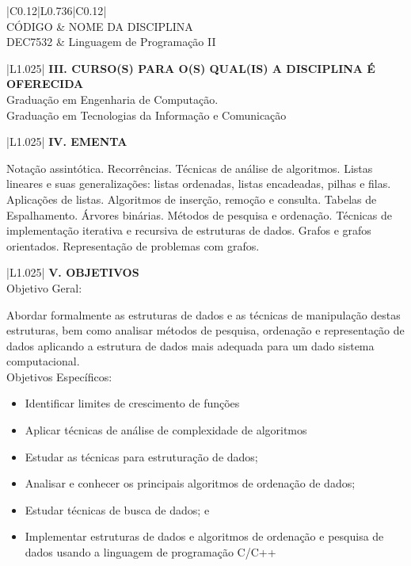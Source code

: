 \documentclass[12pt]{article}
\newcommand{\requisitoA}{DEC7532 & Linguagem de Programação II}
\newcommand{\requisitoB}{}
\newcommand{\requisitoC}{}
\newcommand{\cursoA}{Graduação em Engenharia de Computação. \\ \hline}
\newcommand{\cursoB}{Graduação em Tecnologias da Informação e Comunicação \\ \hline}
\newcommand{\cursoC}{}
\newcommand{\ementa}{

Notação assintótica. Recorrências. Técnicas de análise de algoritmos. Listas lineares e suas generalizações: listas ordenadas, listas encadeadas, pilhas e filas. Aplicações de listas. Algoritmos de inserção, remoção e consulta. Tabelas de Espalhamento. Árvores binárias. Métodos de pesquisa e ordenação. Técnicas de implementação iterativa e recursiva de estruturas de dados. Grafos e grafos orientados. Representação de problemas com grafos.
 \\ \hline
}
\begin{document}
\begin{longtable}{|C{0.12\textwidth}|L{0.736\textwidth}|C{0.12\textwidth}|} \hline
%
 \\ \hline
%
CÓDIGO & NOME DA DISCIPLINA \\ \hline	
%
\requisitoA \\ \hline
\requisitoB
\requisitoC
\end{longtable}


\begin{longtable}{|L{1.025\textwidth}|} \hline
%
{\bf III. CURSO(S) PARA O(S) QUAL(IS) A DISCIPLINA É OFERECIDA } \\ \hline
%
\cursoA 
\cursoB
\cursoC

\end{longtable}

\begin{longtable}{|L{1.025\textwidth}|} \hline
%
{\bf IV. EMENTA } \\ \hline
%
\ementa
\end{longtable}

\newpage



\begin{longtable}{|L{1.025\textwidth}|} \hline
%
{\bf V. OBJETIVOS } \\ \hline
%
Objetivo Geral:

Abordar formalmente as estruturas de dados e as técnicas de
manipulação destas estruturas, bem como analisar métodos de pesquisa, ordenação e
representação de dados aplicando a estrutura de dados mais adequada para um dado
sistema computacional. \\

Objetivos Específicos:
\begin{itemize}
\item Identificar limites de crescimento de funções
\item Aplicar técnicas de análise de complexidade de algoritmos
\item Estudar as técnicas para estruturação de dados;
\item Analisar e conhecer os principais algoritmos de ordenação de dados;
\item Estudar técnicas de busca de dados; e
\item Implementar estruturas de dados e algoritmos de ordenação e pesquisa de dados
usando a linguagem de programação C/C++
\end{itemize}

\\ \hline
\end{longtable}
\end{document}
